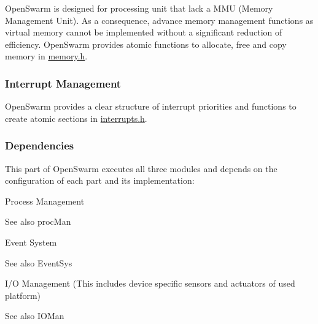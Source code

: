 Open\+Swarm is designed for processing unit that lack a M\+M\+U (Memory Management Unit). As a consequence, advance memory management functions as virtual memory cannot be implemented without a significant reduction of efficiency. Open\+Swarm provides atomic functions to allocate, free and copy memory in \hyperlink{memory_8h}{memory.\+h}.\hypertarget{group__base_ssec_intro_base_irq}{}\subsubsection{Interrupt Management}\label{group__base_ssec_intro_base_irq}
Open\+Swarm provides a clear structure of interrupt priorities and functions to create atomic sections in \hyperlink{interrupts_8h}{interrupts.\+h}.\hypertarget{group__base_ssec_intro_base_deps}{}\subsubsection{Dependencies}\label{group__base_ssec_intro_base_deps}
This part of Open\+Swarm executes all three modules and depends on the configuration of each part and its implementation\+:
\begin{DoxyItemize}
\item Process Management \begin{DoxySeeAlso}{See also}
proc\+Man
\end{DoxySeeAlso}

\item Event System \begin{DoxySeeAlso}{See also}
Event\+Sys
\end{DoxySeeAlso}

\item I/\+O Management (This includes device specific sensors and actuators of used platform) \begin{DoxySeeAlso}{See also}
I\+O\+Man 
\end{DoxySeeAlso}

\end{DoxyItemize}